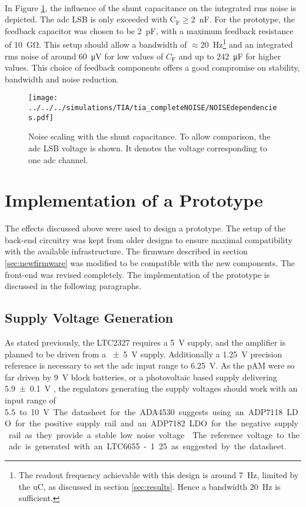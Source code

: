 \\
In Figure \ref{fig:tia:noise:dep}, the influence of the shunt capacitance on the integrated rms noise is depicted. The \ac{adc} \ac{LSB} is only exceeded with C$_\text{F}\geq$\SI{2}{\nano\farad}.
For the prototype, the feedback capacitor was chosen to be \SI{2}{\pico\farad}, with a maximum feedback resistance of \SI{10}{\giga\ohm}. This setup should allow a bandwidth of $\approx$\SI{20}{\hertz}\footnote{The readout frequency achievable with this design is around \SI{7}{\hertz}, limited by the \ac{uC}, as discussed in section \ref{sec:results}. Hence a bandwidth \SI{20}{\hertz} is sufficient.} and an integrated rms noise of around \SI{60}{\micro\volt} for low values of $C_\text{F}$ and up to \SI{242}{\micro\farad} for higher values. 
This choice of feedback components offers a good compromise on stability, bandwidth and noise reduction.
\begin{figure}
	\centering
	\texttt{[image: ../../../simulations/TIA/tia\_completeNOISE/NOISEdependencies.pdf]}
	\caption{Noise scaling with the shunt capacitance. To allow comparison, the \ac{adc} LSB voltage is shown. It denotes the voltage corresponding to one \ac{adc} channel.}
	\label{fig:tia:noise:dep}
\end{figure}
\section{Implementation of a Prototype}
\label{sec:proto:frontend}
The effects discussed above were used to design a prototype. The setup of the back-end circuitry was kept from older designs to ensure maximal compatibility with the available infrastructure. The firmware described in section \ref{sec:newfirmware} was modified to be compatible with the new components. The front-end was revised completely. The implementation of the prototype is discussed in the following paragraphs.
\subsection*{Supply Voltage Generation}
As stated previously, the LTC2327 requires a \SI{5}{\volt} supply, and the amplifier is planned to be driven from a \SI{\pm5}{\volt} supply. Additionally a \SI{1.25}{\volt} precision reference is necessary to set the \ac{adc} input range to \SI{6.25}{\volt}.
As the \ac{pAM} were so far driven by \SI{9}{\volt} block batteries, or a photovoltaic based supply delivering \SI{5.9\pm0.1}{\volt} \cite{rudolph}, the regulators generating the supply voltages should work with an input range of \SI{5.5} to \SI{10}{\volt}. The datasheet for the ADA4530 suggests using an ADP7118 LDO for the positive supply rail and an ADP7182 LDO for the negative supply rail as they provide a stable low noise voltage \cite{ADA4530}. The reference voltage to the \ac{adc} is generated with an LTC6655-1.25 as suggested by the datasheet.
